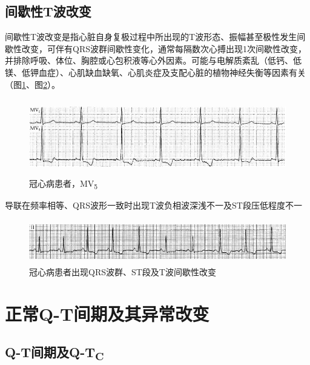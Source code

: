 \protect\hypertarget{text00012.htmlux5cux23subid99}{}{}

\section{间歇性T波改变}

间歇性T波改变是指心脏自身复极过程中所出现的T波形态、振幅甚至极性发生间歇性改变，可伴有QRS波群间歇性变化，通常每隔数次心搏出现1次间歇性改变，并排除呼吸、体位、胸腔或心包积液等心外因素。可能与电解质紊乱（低钙、低镁、低钾血症）、心肌缺血缺氧、心肌炎症及支配心脏的植物神经失衡等因素有关（图\ref{fig6-18}、图\ref{fig6-19}）。

\begin{figure}[!htbp]
 \centering
 \includegraphics[width=5.58333in,height=1.30208in]{./images/Image00110.jpg}
 \captionsetup{justification=centering}
 \caption{冠心病患者，MV\textsubscript{5}}
 \label{fig6-18}
  \end{figure} 
导联在频率相等、QRS波形一致时出现T波负相波深浅不一及ST段压低程度不一

\begin{figure}[!htbp]
 \centering
 \includegraphics[width=5.58333in,height=0.75in]{./images/Image00111.jpg}
 \captionsetup{justification=centering}
 \caption{冠心病患者出现QRS波群、ST段及T波间歇性改变}
 \label{fig6-19}
  \end{figure} 

\protect\hypertarget{text00013.html}{}{}

\protect\hypertarget{text00013.htmlux5cux23chapter13}{}{}

\chapter{正常Q-T间期及其异常改变}

\protect\hypertarget{text00013.htmlux5cux23subid100}{}{}

\section{Q-T间期及Q-T\textsubscript{C}}

